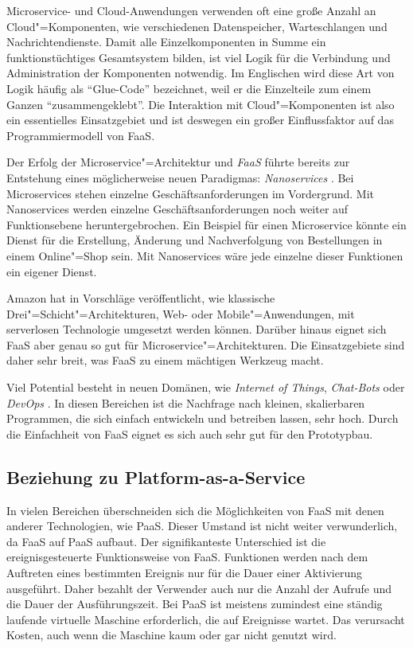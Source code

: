 Microservice- und Cloud-Anwendungen verwenden oft eine große Anzahl an Cloud"=Komponenten, wie verschiedenen Datenspeicher, Warteschlangen und Nachrichtendienste. Damit alle Einzelkomponenten in Summe ein funktionstüchtiges Gesamtsystem bilden, ist viel Logik für die Verbindung und Administration der Komponenten notwendig. Im Englischen wird diese Art von Logik häufig als "`Glue-Code"' bezeichnet, weil er die Einzelteile zum einem Ganzen "`zusammengeklebt"'. Die Interaktion mit Cloud"=Komponenten ist also ein essentielles Einsatzgebiet und ist deswegen ein großer Einflussfaktor auf das Programmiermodell von FaaS.

Der Erfolg der Microservice"=Architektur und \textit{FaaS} führte bereits zur Entstehung eines möglicherweise neuen Paradigmas: \textit{Nanoservices} \cite{infoqFaaS}. Bei Microservices stehen einzelne Geschäftsanforderungen im Vordergrund. Mit Nanoservices werden einzelne Geschäftsanforderungen noch weiter auf Funktionsebene heruntergebrochen. Ein Beispiel für einen Microservice könnte ein Dienst für die Erstellung, Änderung und Nachverfolgung von Bestellungen in einem Online"=Shop sein. Mit Nanoservices wäre jede einzelne dieser Funktionen ein eigener Dienst.

Amazon hat in \cite{AwsMultiTier} Vorschläge veröffentlicht, wie klassische Drei"=Schicht"=Architekturen, \zB Web- oder Mobile"=Anwendungen, mit serverlosen Technologie umgesetzt werden können. Darüber hinaus eignet sich FaaS aber genau so gut für Microservice"=Architekturen. Die Einsatzgebiete sind daher sehr breit, was FaaS zu einem mächtigen Werkzeug macht.

Viel Potential besteht in neuen Domänen, wie \textit{Internet of Things}, \textit{Chat-Bots} oder \textit{DevOps} \cite{NewStackAzurePreview}. In diesen Bereichen ist die Nachfrage nach kleinen, skalierbaren Programmen, die sich einfach entwickeln und betreiben lassen, sehr hoch. Durch die Einfachheit von FaaS eignet es sich auch sehr gut für den Prototypbau.

\subsection{Beziehung zu Platform-as-a-Service}

In vielen Bereichen überschneiden sich die Möglichkeiten von FaaS mit denen anderer Technologien, wie \zB PaaS. Dieser Umstand ist nicht weiter verwunderlich, da FaaS auf PaaS aufbaut. Der signifikanteste Unterschied ist die ereignisgesteuerte Funktionsweise von FaaS. Funktionen werden nach dem Auftreten eines bestimmten Ereignis nur für die Dauer einer Aktivierung ausgeführt. Daher bezahlt der Verwender auch nur die Anzahl der Aufrufe und die Dauer der Ausführungszeit. Bei PaaS ist meistens zumindest eine ständig laufende virtuelle Maschine erforderlich, die auf Ereignisse wartet. Das verursacht Kosten, auch wenn die Maschine kaum oder gar nicht genutzt wird.

